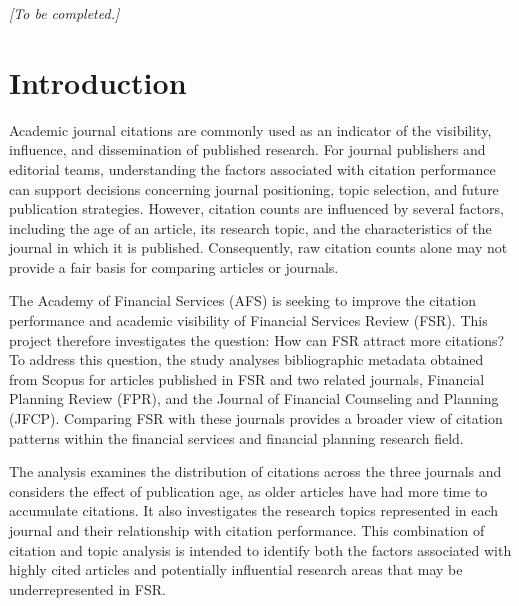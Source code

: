 \documentclass[11pt,a4paper]{article}
\begin{document}
\textit{[To be completed.]}

\clearpage

\section{Introduction}\label{introduction}

Academic journal citations are commonly used as an indicator of the visibility, influence, and dissemination of published research. For journal publishers and editorial teams, understanding the factors associated with citation performance can support decisions concerning journal positioning, topic selection, and future publication strategies. However, citation counts are influenced by several factors, including the age of an article, its research topic, and the characteristics of the journal in which it is published. Consequently, raw citation counts alone may not provide a fair basis for comparing articles or journals.

The Academy of Financial Services (AFS) is seeking to improve the citation performance and academic visibility of Financial Services Review (FSR). This project therefore investigates the question: How can FSR attract more citations? To address this question, the study analyses bibliographic metadata obtained from Scopus for articles published in FSR and two related journals, Financial Planning Review (FPR), and the Journal of Financial Counseling and Planning (JFCP). Comparing FSR with these journals provides a broader view of citation patterns within the financial services and financial planning research field.

The analysis examines the distribution of citations across the three journals and considers the effect of publication age, as older articles have had more time to accumulate citations. It also investigates the research topics represented in each journal and their relationship with citation performance. This combination of citation and topic analysis is intended to identify both the factors associated with highly cited articles and potentially influential research areas that may be underrepresented in FSR.
\end{document}
